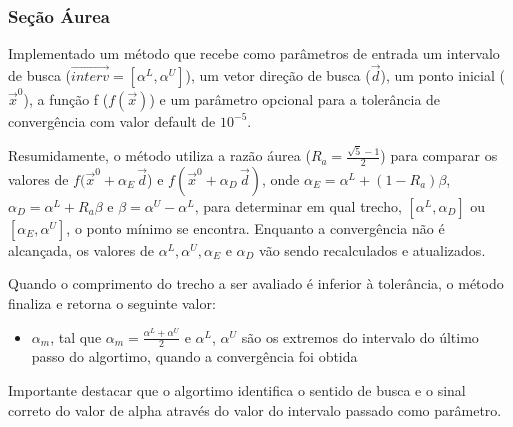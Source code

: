 \documentclass[10pt, a4paper]{article}
\begin{document}
\subsubsection{Seção Áurea}

Implementado um método que recebe como parâmetros de entrada um intervalo de busca
($\overrightarrow{interv} = [\alpha^L, \alpha^U]$), um vetor direção de busca ($\overrightarrow{d}$),
um ponto inicial ($\overrightarrow{x}^0$), a função f ($f(\overrightarrow{x})$) 
e um parâmetro opcional para a tolerância de convergência com valor default de $10^{-5}$.

Resumidamente, o método utiliza a razão áurea ($R_a = \frac{\sqrt{5} - 1}{2}$) para comparar os 
valores de $f(\overrightarrow{x}^0 + \alpha_{E}\,\overrightarrow{d}$) e
$f(\overrightarrow{x}^0 + \alpha_{D}\,\overrightarrow{d})$,
onde $\alpha_{E} = \alpha^L + (1 - R_a )\beta$, $\alpha_{D} = \alpha^L + R_a\beta$ e $\beta = \alpha^U - \alpha^L$, 
para determinar em qual trecho, $[\alpha^L, \alpha_{D}]$ ou $[\alpha_{E}, \alpha^U]$, o ponto mínimo se encontra. Enquanto a
convergência não é alcançada, os valores de $\alpha^L, \alpha^U, \alpha_E$ e $\alpha_D$ vão sendo recalculados e atualizados.

Quando o comprimento do trecho a ser avaliado é inferior à tolerância, o método finaliza e retorna o seguinte valor:

\begin{itemize}
  \item $\alpha_{m}$, tal que $\alpha_{m} = \frac{\alpha^L + \alpha^U}{2}$ e $\alpha^L$, $\alpha^U$ são os extremos do
  intervalo do último passo do algortimo, quando a convergência foi obtida
\end{itemize} 

Importante destacar que o algortimo identifica o sentido de busca e
o sinal correto do valor de alpha através do valor do intervalo passado como parâmetro.
\end{document}
